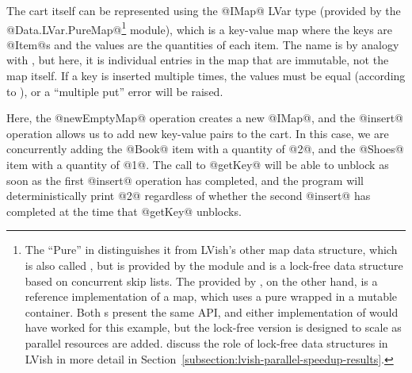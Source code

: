\noindent The cart itself can be represented using the @IMap@ LVar
type (provided by the @Data.LVar.PureMap@\footnote{The ``Pure'' in
   distinguishes it from LVish's other map data
  structure, which is also called , but is provided by the
   module and is a lock-free data structure based
  on concurrent skip lists.  The  provided by
  , on the other hand, is a reference
  implementation of a map, which uses a pure  wrapped in
  a mutable container.  Both s present the same API, and
  either implementation of  would have worked for this
  example, but the lock-free version is designed to scale as parallel
  resources are added.   discuss the role of lock-free
  data structures in LVish in more detail in
  Section~\ref{subsection:lvish-parallel-speedup-results}.} module),
which is a key-value map where the keys are @Item@s and the values are
the quantities of each item.  The name  is by analogy with
, but here, it is individual entries in the map that are
immutable, not the map itself.  If a key is inserted multiple times,
the values must be equal (according to \il{==}), or a ``multiple put''
error will be raised.

\singlespacing

\doublespacing

\noindent Here, the @newEmptyMap@ operation creates a new @IMap@, and the
@insert@ operation allows us to add new key-value pairs to the cart.
In this case, we are concurrently adding the @Book@ item with a
quantity of @2@, and the @Shoes@ item with a quantity of @1@.  The
call to @getKey@ will be able to unblock as soon as the first @insert@
operation has completed, and the program will deterministically print
@2@ regardless of whether the second @insert@ has completed at the
time that @getKey@ unblocks.

